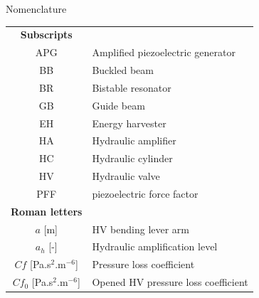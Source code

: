 \documentclass[3p,twocolumn,preprint]{elsarticle}
\begin{document}
\begin{table}
\begin{large}
	\begin{center}
		Nomenclature	\\
		\noindent\makebox[\linewidth]{\rule{\textwidth}{0.4pt}}
	\end{center}
\end{large}		
\begin{minipage}{.5\textwidth}
	\begin{tabular}{ c  m{6cm} }
		\textbf{Subscripts}      &                                                         \\
		APG                      & Amplified piezoelectric generator                       \\
		BB                       & Buckled beam                                           \\
		BR                       & Bistable resonator                                      \\
		GB                       & Guide beam                                             \\
		EH                       & Energy harvester                                        \\
		HA                       & Hydraulic amplifier                                     \\
		HC                       & Hydraulic cylinder                                      \\
		HV                       & Hydraulic valve                                         \\
		PFF						 & piezoelectric force factor  \\
		\textbf{Roman letters}   &                                                         \\
		$a$ [m]                  & HV bending lever arm                                    \\
		$a_h$ [-]                & Hydraulic amplification level                           \\
		$Cf$ [Pa.s$^2$.m$^{-6}$]         & Pressure loss coefficient                               \\
		$Cf_0$ [Pa.s$^2$.m$^{-6}$]       & Opened HV pressure loss coefficient                     \\

\end{tabular}
\end{minipage}
\end{table}
\end{document}
